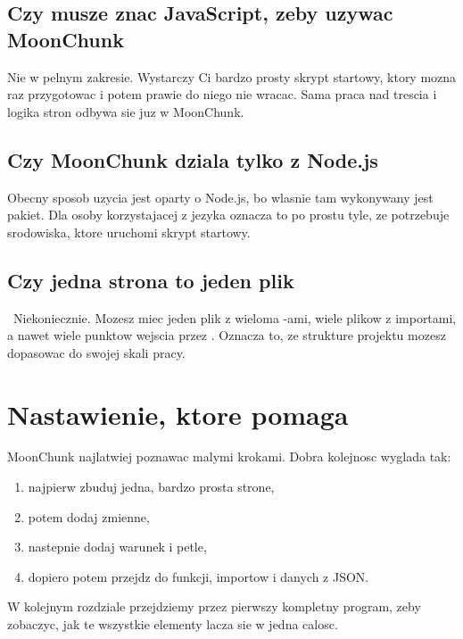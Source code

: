 \subsection*{Czy musze znac JavaScript, zeby uzywac MoonChunk}
Nie w pelnym zakresie. Wystarczy Ci bardzo prosty skrypt startowy, ktory mozna raz
przygotowac i potem prawie do niego nie wracac. Sama praca nad trescia i logika stron
odbywa sie juz w MoonChunk.

\subsection*{Czy MoonChunk dziala tylko z Node.js}
Obecny sposob uzycia jest oparty o Node.js, bo wlasnie tam wykonywany jest pakiet.
Dla osoby korzystajacej z jezyka oznacza to po prostu tyle, ze potrzebuje srodowiska,
ktore uruchomi skrypt startowy.

\subsection*{Czy jedna strona to jeden plik}\
Niekoniecznie. Mozesz miec jeden plik z wieloma -ami, wiele plikow z importami,
a nawet wiele punktow wejscia przez \mc{moon(...)}. Oznacza to, ze strukture projektu
mozesz dopasowac do swojej skali pracy.

\section{Nastawienie, ktore pomaga}
MoonChunk najlatwiej poznawac malymi krokami. Dobra kolejnosc wyglada tak:

\begin{enumerate}
  \item najpierw zbuduj jedna, bardzo prosta strone,
  \item potem dodaj zmienne,
  \item nastepnie dodaj warunek i petle,
  \item dopiero potem przejdz do funkcji, importow i danych z JSON.
\end{enumerate}

W kolejnym rozdziale przejdziemy przez pierwszy kompletny program, zeby zobaczyc,
jak te wszystkie elementy lacza sie w jedna calosc.
